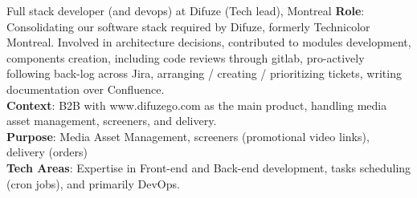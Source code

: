 \documentclass[
  a4paper,
   maincolor=cvblue,
   sectioncolor=cvblue,
]{fortysecondscv}
\begin{document}





\newpage
\restoregeometry
{}\paperwidth

\makefrontsidebar

\begin{cvtable}
    {Full stack developer (and devops) at Difuze}
    {(Tech lead), Montreal}
    {
      \textbf{Role}: Consolidating our software stack required by Difuze, formerly Technicolor Montreal. Involved in architecture decisions, contributed to modules development, components creation, including code reviews through gitlab, pro-actively following back-log across Jira, arranging / creating / prioritizing tickets, writing documentation over Confluence.\\
      \textbf{Context}: B2B with www.difuzego.com as the main product, handling media asset management, screeners, and delivery.\\
      \textbf{Purpose}: Media Asset Management, screeners (promotional video links), delivery (orders)\\
      \textbf{Tech Areas}: Expertise in Front-end and Back-end development, tasks scheduling (cron jobs), and primarily DevOps.\\
    }
\end{cvtable}







\end{document}
